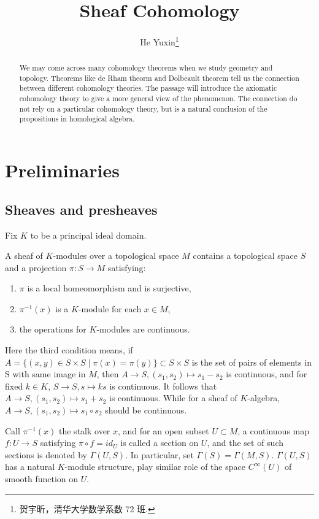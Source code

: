\documentclass[twoside]{article}
\begin{document}
\title{Sheaf  Cohomology}
\author{He Yuxin\footnote{贺宇昕，清华大学数学系数 72 班.}}


\begin{abstract}
    We may come across many cohomology theorems  when we study geometry and topology. Theorems like de Rham theorm and Dolbeault theorem tell us the connection between different cohomology theories. The passage will introduce the axiomatic cohomology theory to  give a more general view of the phenomenon. The connection do not rely on a particular cohomology theory,  but is a natural conclusion of the propositions in homological algebra.
\end{abstract}

\tableofcontents
\section{Preliminaries}
\subsection{Sheaves and presheaves}

Fix $K$ to be a principal ideal domain.

 \begin{definition}
   A sheaf of $K$-modules over a topological space $M$ contains a topological space $S$ and a projection  $\pi \colon S\to M$ satisfying:
   \begin{enumerate}
     \item $\pi$ is a local homeomorphism and is surjective,
     \item $\pi^{-1}(x)$ is a $K$-module for each $x\in M$,
     \item the  operations for $K$-modules are continuous.
   \end{enumerate}
 \end{definition}
Here the third condition means, if  $A=\{(x,y)\in S\times S \mid \pi(x)=\pi(y)\}\subset S\times S$ is the set of pairs of elements in S with same image in $M$, then $A\to S,(s_1,s_2)\mapsto s_1-s_2$ is continuous, and for fixed $k\in K$, $S\to S, s\mapsto ks$ is continuous. It follows that $A\to S,(s_1,s_2)\mapsto s_1+s_2$ is continuous.  While for a sheaf of $K$-algebra,  $A\to S,(s_1,s_2)\mapsto s_1\circ s_2$ should be continuous.

Call $\pi^{-1}(x)$ the stalk over $x$, and for an open subset $U\subset M$, a continuous map $f\colon U\to S$ satisfying $\pi\circ f=id_U$ is called a section on $U$, and the set of such sections is denoted by $\Gamma(U,S)$. In particular, set $\Gamma(S)=\Gamma(M,S)$. $\Gamma(U,S)$ has a  natural $K$-module structure, play similar role of the space $C^\infty(U)$ of smooth function on $U$.
\end{document}
